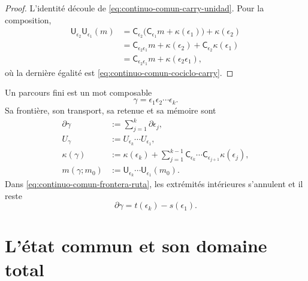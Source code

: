 \begin{proof}
L'identité découle de \eqref{eq:continuo-comun-carry-unidad}. Pour la composition,
\begin{align*}
 \mathsf U_{\epsilon_2}\mathsf U_{\epsilon_1}(m)
 &=\mathsf C_{\epsilon_2}
   \bigl(\mathsf C_{\epsilon_1}m+\kappa(\epsilon_1)\bigr)
   +\kappa(\epsilon_2)\\
 &=\mathsf C_{\epsilon_2\epsilon_1}m
   +\kappa(\epsilon_2)
   +\mathsf C_{\epsilon_2}\kappa(\epsilon_1)\\
 &=\mathsf C_{\epsilon_2\epsilon_1}m
   +\kappa(\epsilon_2\epsilon_1),
\end{align*}
où la dernière égalité est \eqref{eq:continuo-comun-cociclo-carry}.
\end{proof}

Un parcours fini est un mot composable
\begin{equation}
\label{eq:continuo-comun-ruta}
 \gamma=\epsilon_1\epsilon_2\cdots\epsilon_k.
\end{equation}
Sa frontière, son transport, sa retenue et sa mémoire sont
\begin{align}
 \partial\gamma
 &:=\sum_{j=1}^{k}\partial\epsilon_j,
 \label{eq:continuo-comun-frontera-ruta}\\
 U_\gamma
 &:=U_{\epsilon_k}\cdots U_{\epsilon_1},
 \label{eq:continuo-comun-transporte-ruta}\\
 \kappa(\gamma)
 &:=\kappa(\epsilon_k)
   +\sum_{j=1}^{k-1}
    \mathsf C_{\epsilon_k}\cdots\mathsf C_{\epsilon_{j+1}}
    \kappa(\epsilon_j),
 \label{eq:continuo-comun-carry-ruta}\\
 m(\gamma;m_0)
 &:=\mathsf U_{\epsilon_k}\cdots
       \mathsf U_{\epsilon_1}(m_0).
 \label{eq:continuo-comun-memoria-ruta}
\end{align}
Dans \eqref{eq:continuo-comun-frontera-ruta}, les extrémités intérieures s'annulent et il reste
\begin{equation}
\label{eq:continuo-comun-frontera-telescopica}
 \partial\gamma=t(\epsilon_k)-s(\epsilon_1).
\end{equation}

\section{L'état commun et son domaine total}
\label{sec:continuo-comun-estado-total}

